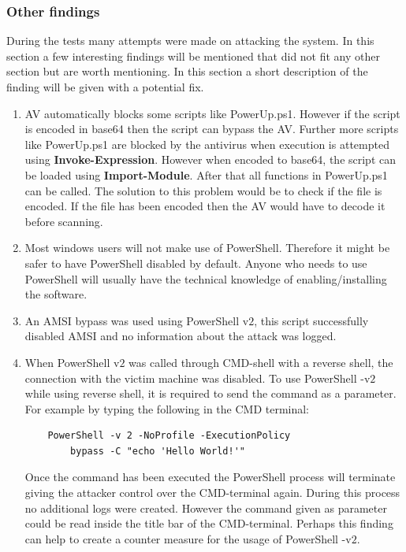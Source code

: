\documentclass{article}%
\begin{document}
\subsubsection{Other findings}
During the tests many attempts were made on attacking the system. In this section a few interesting findings will be mentioned that did not fit any other section but are worth mentioning. In this section a short description of the finding will be given with a potential fix.
\begin{enumerate}
	\item AV automatically blocks some scripts like PowerUp.ps1. However if the script is encoded in base64 then the script can bypass the AV. Further more scripts like PowerUp.ps1 are blocked by the antivirus when execution is attempted using \textbf{Invoke-Expression}. However when encoded to base64, the script can be loaded using \textbf{Import-Module}. After that all functions in PowerUp.ps1 can be called. The solution to this problem would be to check if the file is encoded. If the file has been encoded then the AV would have to decode it before scanning.
	\item Most windows users will not make use of PowerShell. Therefore it might be safer to have PowerShell disabled by default. Anyone who needs to use PowerShell will usually have the technical knowledge of enabling/installing the software.
	\item An AMSI bypass was used using PowerShell v$2$, this script successfully disabled AMSI and no information about the attack was logged.
	\item When PowerShell v$2$ was called through CMD-shell with a reverse shell, the connection with the victim machine was disabled. To use PowerShell -v$2$ while using reverse shell, it is required to send the command as a parameter.
	For example by typing the following in the CMD terminal:
	\begin{verbatim}
	PowerShell -v 2 -NoProfile -ExecutionPolicy
	    bypass -C "echo 'Hello World!'"
	\end{verbatim}
	Once the command has been executed the PowerShell process will terminate giving the attacker control over the CMD-terminal again. During this process no additional logs were created. However the command given as parameter could be read inside the title bar of the CMD-terminal. Perhaps this finding can help to create a counter measure for the usage of PowerShell -v$2$.
\end{enumerate}
\end{document}
